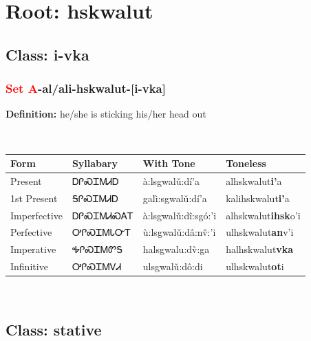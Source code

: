 \needspace{4in}
\section*{Root: hskwalut}
\nopagebreak
{}
\needspace{3in}
\subsection*{Class: i-vka}
\nopagebreak
\needspace{2in}
\subsubsection*{\textcolor{Red}{Set A}{-}al/ali{-}\textbf{hskwalut}{-}[i-vka]}
\nopagebreak
\textbf{Definition: } he/she is sticking his/her head out
\\[0.5em]
\begin{tabularx}{\textwidth}{l X X X}%
\toprule%
\textbf{Form}&\textbf{Syllabary}&\textbf{With Tone}&\textbf{Toneless}\\%
\midrule%
Present&ᎠᎵᏍᏆᎷᏗᎠ&à:lsgwalǔ:dí’a&alhskwalut\textbf{i'}a\\%
1st Present&ᎦᎵᏍᏆᎷᏗᎠ&galì:sgwalǔ:dí’a&kalihskwalut\textbf{i'}a\\%
Imperfective&ᎠᎵᏍᏆᎷᏗᏍᎪᎢ&à:lsgwalǔ:dî:sgó:’i&alhskwalut\textbf{ihsk}o'i\\%
Perfective&ᎤᎵᏍᏆᎷᏓᏅᎢ&ù:lsgwalǔ:dâ:nv̌:’i&ulhskwalut\textbf{an}v'i\\%
Imperative&ᎭᎵᏍᏆᎷᏛᎦ&halsgwalu:dv̀:ga&halhskwalut\textbf{vka}\\%
Infinitive&ᎤᎵᏍᏆᎷᏙᏗ&ulsgwalǔ:dô:di&ulhskwalut\textbf{ot}i\\%
\bottomrule%
\end{tabularx}
\\[1em]
\needspace{3in}
\subsection*{Class: stative}
\nopagebreak
\needspace{2in}
